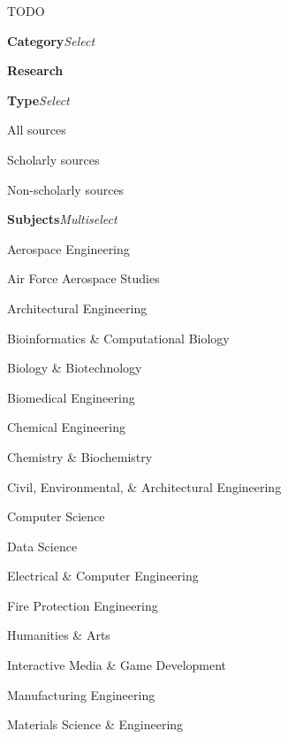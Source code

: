 TODO

\begin{CompactItemize}
    \item \textbf{Category}\quad\textit{Select}
    \begin{CompactItemize}
        \item \textbf{Research}
        \begin{CompactItemize}
            \item \textbf{Type}\quad\textit{Select}
            \begin{CompactItemize}
                \item All sources
                \item Scholarly sources
                \item Non-scholarly sources
            \end{CompactItemize}
            \item \textbf{Subjects}\quad\textit{Multiselect}
            \begin{CompactItemize}
                \item Aerospace Engineering
                \item Air Force Aerospace Studies
                \item Architectural Engineering
                \item Bioinformatics \& Computational Biology
                \item Biology \& Biotechnology
                \item Biomedical Engineering
                \item Chemical Engineering
                \item Chemistry \& Biochemistry
                \item Civil, Environmental, \& Architectural Engineering
                \item Computer Science
                \item Data Science
                \item Electrical \& Computer Engineering
                \item Fire Protection Engineering
                \item Humanities \& Arts
                \item Interactive Media \& Game Development
                \item Manufacturing Engineering
                \item Materials Science \& Engineering

\end{CompactItemize}
\end{CompactItemize}
\end{CompactItemize}
\end{CompactItemize}
